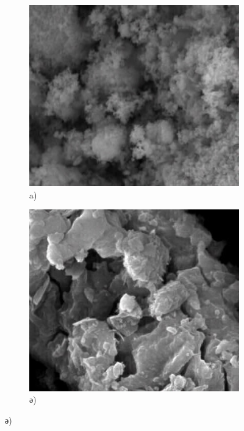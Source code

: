 \begin{figure}[H]
    \centering
    \begin{subfigure}[b]{0.32\textwidth}
        \centering
        \includegraphics[width=\textwidth]{assets/71}
        \caption*{a)}
    \end{subfigure}
    \hfill
    \begin{subfigure}[b]{0.32\textwidth}
        \centering
        \includegraphics[width=\textwidth]{assets/72}
        \caption*{ә)}

\end{subfigure}
\end{figure}
